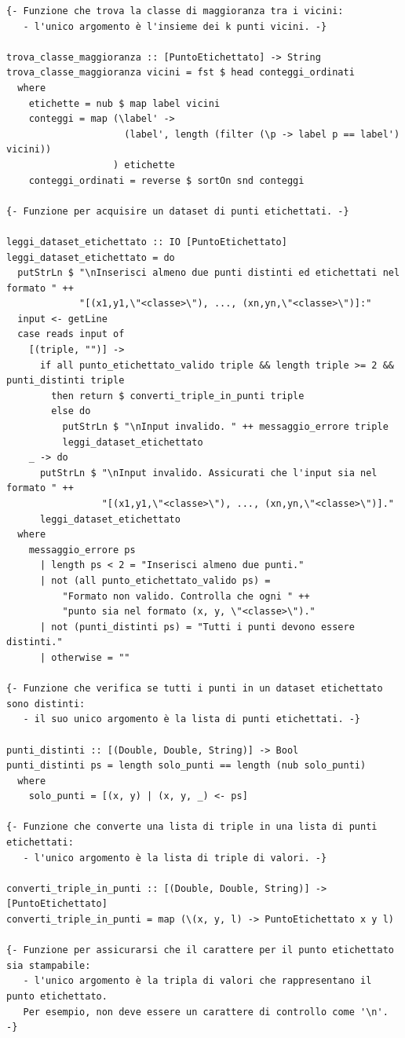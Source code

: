 \documentclass[11pt]{article}
\theoremstyle{definition}
\begin{document}
\begin{verbatim}
{- Funzione che trova la classe di maggioranza tra i vicini:
   - l'unico argomento è l'insieme dei k punti vicini. -}

trova_classe_maggioranza :: [PuntoEtichettato] -> String
trova_classe_maggioranza vicini = fst $ head conteggi_ordinati
  where
    etichette = nub $ map label vicini
    conteggi = map (\label' -> 
                     (label', length (filter (\p -> label p == label') vicini))
                   ) etichette
    conteggi_ordinati = reverse $ sortOn snd conteggi

{- Funzione per acquisire un dataset di punti etichettati. -}

leggi_dataset_etichettato :: IO [PuntoEtichettato]
leggi_dataset_etichettato = do
  putStrLn $ "\nInserisci almeno due punti distinti ed etichettati nel formato " ++
             "[(x1,y1,\"<classe>\"), ..., (xn,yn,\"<classe>\")]:"
  input <- getLine
  case reads input of
    [(triple, "")] ->
      if all punto_etichettato_valido triple && length triple >= 2 && punti_distinti triple
        then return $ converti_triple_in_punti triple
        else do
          putStrLn $ "\nInput invalido. " ++ messaggio_errore triple
          leggi_dataset_etichettato
    _ -> do
      putStrLn $ "\nInput invalido. Assicurati che l'input sia nel formato " ++ 
                 "[(x1,y1,\"<classe>\"), ..., (xn,yn,\"<classe>\")]."
      leggi_dataset_etichettato
  where
    messaggio_errore ps
      | length ps < 2 = "Inserisci almeno due punti."
      | not (all punto_etichettato_valido ps) = 
          "Formato non valido. Controlla che ogni " ++ 
          "punto sia nel formato (x, y, \"<classe>\")."
      | not (punti_distinti ps) = "Tutti i punti devono essere distinti."
      | otherwise = ""

{- Funzione che verifica se tutti i punti in un dataset etichettato sono distinti: 
   - il suo unico argomento è la lista di punti etichettati. -}

punti_distinti :: [(Double, Double, String)] -> Bool
punti_distinti ps = length solo_punti == length (nub solo_punti)
  where
    solo_punti = [(x, y) | (x, y, _) <- ps]

{- Funzione che converte una lista di triple in una lista di punti etichettati:
   - l'unico argomento è la lista di triple di valori. -}

converti_triple_in_punti :: [(Double, Double, String)] -> [PuntoEtichettato]
converti_triple_in_punti = map (\(x, y, l) -> PuntoEtichettato x y l)

{- Funzione per assicurarsi che il carattere per il punto etichettato sia stampabile:
   - l'unico argomento è la tripla di valori che rappresentano il punto etichettato.
   Per esempio, non deve essere un carattere di controllo come '\n'. -}


\end{verbatim}
\end{document}
